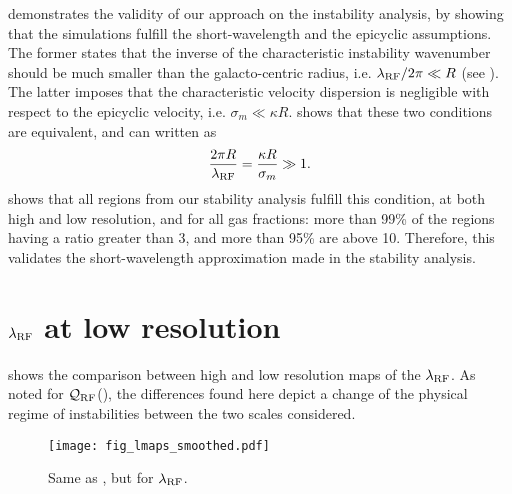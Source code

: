 \documentclass[useAMS,usenatbib]{mnras}
\newcommand{\qrf}{\ensuremath{\mathcal{Q}_{\rm RF}}\xspace}
\newcommand{\lrf}{\ensuremath{\lambda_{\rm RF}}\xspace}
\begin{document}
 demonstrates the validity of our approach on the instability analysis, by showing that the simulations fulfill the short-wavelength and the epicyclic assumptions. The former states that the inverse of the characteristic instability wavenumber should be much smaller than the galacto-centric radius, i.e. $\lrf / 2\pi \ll R$ (see \citealt{Romeo2013}). The latter imposes that the characteristic velocity dispersion is negligible with respect to the epicyclic velocity, i.e. $\sigma_m \ll \kappa R$.  shows that these two conditions are equivalent, and can written as
\begin{equation}
\label{eqn:approx}
\frac{2\pi R}{\lrf} = \frac{\kappa R}{\sigma_m} \gg 1.
\end{equation}
 shows that all regions from our stability analysis fulfill this condition, at both high and low resolution, and for all gas fractions: more than 99\% of the regions having a ratio greater than 3, and more than 95\% are above 10. Therefore, this validates the short-wavelength approximation made in the stability analysis.


\section{\lrf at low resolution}
\label{sec:lowres}

 shows the comparison between high and low resolution maps of the \lrf. As noted for \qrf (), the differences found here depict a change of the physical regime of instabilities between the two scales considered.

\begin{figure*}
\centering
\texttt{[image: fig\_lmaps\_smoothed.pdf]}
\caption{Same as , but for \lrf.}
\label{fig:smoothl}
\end{figure*}
\end{document}
